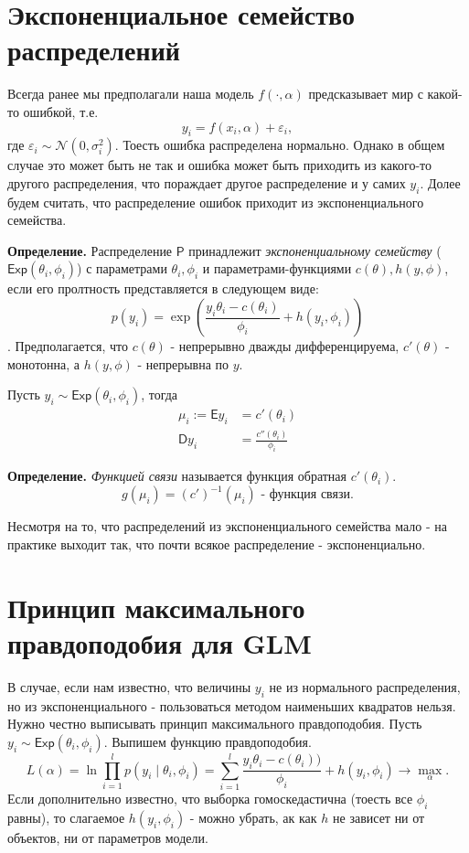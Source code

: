 \section*{Экспоненциальное семейство распределений}
Всегда ранее мы предполагали наша модель $f(\cdot, \alpha)$ предсказывает мир с какой-то ошибкой, т.е.
$$
  y_i = f(x_i, \alpha) + \varepsilon_i,
$$
где $\varepsilon_i \sim \mathcal{N}(0, \sigma_i^2)$. Тоесть ошибка распределена нормально. Однако в общем случае это может быть не так и ошибка может быть приходить из какого-то другого распределения, что пораждает другое распределение и у самих $y_i$. Долее будем считать, что распределение ошибок приходит из экспоненциального семейства.

\noindent\textbf{Определение.} Распределение $\mathsf{P}$ принадлежит \textit{экспоненциальному семейству} ($\mathsf{Exp}(\theta_i, \phi_i)$) с параметрами $\theta_i, \phi_i$ и параметрами-функциями $c(\theta), h(y, \phi)$, если его пролтность представляется в следующем виде:
$$
  p(y_i) = \exp\left(
  \frac{y_i\theta_i - c(\theta_i)}{\phi_i} + h(y_i, \phi_i)
  \right)
$$.
Предполагается, что $c(\theta)$ - непрерывно дважды дифференцируема, $c'(\theta)$ - монотонна, а $h(y, \phi)$ - непрерывна по $y$.

Пусть $y_i \sim \mathsf{Exp}(\theta_i, \phi_i)$, тогда
\begin{align*}
  \mu_i := \mathsf{E}y_i & = c'(\theta_i)                 \\
  \mathsf{D}y_i          & = \frac{c''(\theta_i)}{\phi_i}
\end{align*}

\noindent\textbf{Определение.} \textit{Функцией связи} называется функция обратная $c'(\theta_i)$.
$$
  g(\mu_i) = (c')^{-1}(\mu_i) \text{ - функция связи.}
$$

Несмотря на то, что распределений из экспоненциального семейства мало - на практике выходит так, что почти всякое распределение - экспоненциально.

\section*{Принцип максимального правдоподобия для GLM}
В случае, если нам известно, что величины $y_i$ не из нормального распределения, но из экспоненциального - пользоваться методом наименьших квадратов нельзя. Нужно честно выписывать принцип максимального правдоподобия.
Пусть $y_i \sim \mathsf{Exp}(\theta_i, \phi_i)$. Выпишем функцию правдоподобия.
$$
  L(\alpha) = \ln \prod_{i=1}^l p(y_i \mid \theta_i, \phi_i) = \sum_{i=1}^l \frac{y_i \theta_i - c(\theta_i))}{\phi_i} + h(y_i, \phi_i) \to \max_\alpha.
$$
Если дополнительно известно, что выборка гомоскедастична (тоесть все $\phi_i$ равны), то слагаемое $h(y_i, \phi_i)$ - можно убрать, ак как $h$ не зависет ни от объектов, ни от параметров модели.

